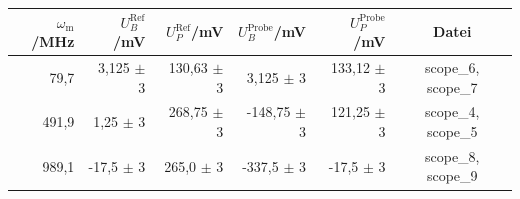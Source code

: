 \begin{center}
    \captionsetup{type=table}
    \begin{tabular}{r | r r r r | c }
        $\omega_\mathrm{m}$/MHz & $U^{\mathrm{Ref}}_B$/mV & $U^{\mathrm{Ref}}_P$/mV & $U^{\mathrm{Probe}}_B$/mV & $U^{\mathrm{Probe}}_P$/mV & Datei \\ \hline
        79,7   & 3,125 $\pm$ 3 & 130,63 $\pm$ 3 & 3,125 $\pm$ 3 & 133,12 $\pm$ 3  & scope\_6, scope\_7 \\
        491,9  & 1,25 $\pm$ 3 & 268,75 $\pm$ 3 & -148,75 $\pm$ 3 & 121,25 $\pm$ 3 & scope\_4, scope\_5 \\
        989,1  & -17,5 $\pm$ 3 & 265,0 $\pm$ 3 & -337,5 $\pm$ 3 & -17,5 $\pm$ 3 & scope\_8, scope\_9 \\
    \end{tabular}
    \label{tab:absorp}
\end{center}


%
%
